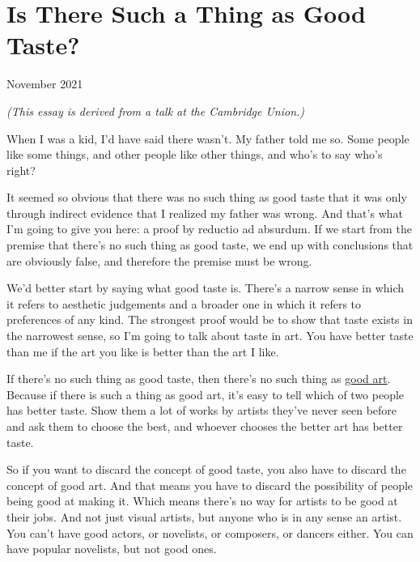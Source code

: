 \chapter{Is There Such a Thing as Good Taste?}


            
              
                

November 2021

\emph{(This essay is derived from a talk at the Cambridge
                    Union.)}

When I was a kid, I'd have said there wasn't. My
                  father told me so. Some people like some things, and other
                  people like other things, and who's to say who's right?

It
                  seemed so obvious that there was no such thing as good taste
                  that it was only through indirect evidence that I realized my
                  father was wrong. And that's what I'm going to give you here:
                  a proof by reductio ad absurdum. If we start from the premise
                  that there's no such thing as good taste, we end up with
                  conclusions that are obviously false, and therefore the
                  premise must be wrong.

We'd better start by saying
                  what good taste is. There's a narrow sense in which it refers
                  to aesthetic judgements and a broader one in which it refers
                  to preferences of any kind. The strongest proof would be to
                  show that taste exists in the narrowest sense, so I'm going to
                  talk about taste in art. You have better taste than me if the
                  art you like is better than the art I like.

If
                  there's no such thing as good taste, then there's no such
                  thing as \href{http://www.paulgraham.com/goodart.html}{\underline{good art}}. Because if there is such a thing as good art, it's easy to
                  tell which of two people has better taste. Show them a lot of
                  works by artists they've never seen before and ask them to
                  choose the best, and whoever chooses the better art has better
                  taste.

So if you want to discard the concept of
                  good taste, you also have to discard the concept of good art.
                  And that means you have to discard the possibility of people
                  being good at making it. Which means there's no way for
                  artists to be good at their jobs. And not just visual artists,
                  but anyone who is in any sense an artist. You can't have good
                  actors, or novelists, or composers, or dancers either. You can
                  have popular novelists, but not good ones.

